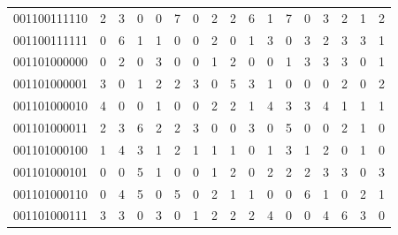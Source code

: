 \documentclass[10pt,a4paper]{article}
\begin{document}
\begin{longtable}{ |c|c|c|c|c|c|c|c|c|c|c|c|c|c|c|c|c| }
    001100111110              & 2                            & 3                                & 0                            & 0                              & 7   & 0   & 2   & 2   & 6   & 1   & 7   & 0   & 3   & 2   & 1   & 2   \\
    001100111111              & 0                            & 6                                & 1                            & 1                              & 0   & 0   & 2   & 0   & 1   & 3   & 0   & 3   & 2   & 3   & 3   & 1   \\
    001101000000              & 0                            & 2                                & 0                            & 3                              & 0   & 0   & 1   & 2   & 0   & 0   & 1   & 3   & 3   & 3   & 0   & 1   \\
    001101000001              & 3                            & 0                                & 1                            & 2                              & 2   & 3   & 0   & 5   & 3   & 1   & 0   & 0   & 0   & 2   & 0   & 2   \\
    001101000010              & 4                            & 0                                & 0                            & 1                              & 0   & 0   & 2   & 2   & 1   & 4   & 3   & 3   & 4   & 1   & 1   & 1   \\
    001101000011              & 2                            & 3                                & 6                            & 2                              & 2   & 3   & 0   & 0   & 3   & 0   & 5   & 0   & 0   & 2   & 1   & 0   \\
    001101000100              & 1                            & 4                                & 3                            & 1                              & 2   & 1   & 1   & 1   & 0   & 1   & 3   & 1   & 2   & 0   & 1   & 0   \\
    001101000101              & 0                            & 0                                & 5                            & 1                              & 0   & 0   & 1   & 2   & 0   & 2   & 2   & 2   & 3   & 3   & 0   & 3   \\
    001101000110              & 0                            & 4                                & 5                            & 0                              & 5   & 0   & 2   & 1   & 1   & 0   & 0   & 6   & 1   & 0   & 2   & 1   \\
    001101000111              & 3                            & 3                                & 0                            & 3                              & 0   & 1   & 2   & 2   & 2   & 4   & 0   & 0   & 4   & 6   & 3   & 0   \\

\end{longtable}
\end{document}

